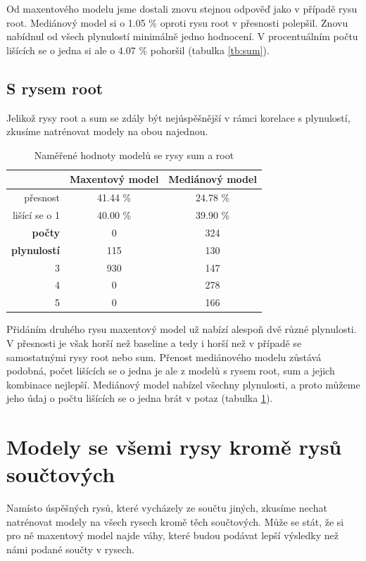 \documentclass[12pt,a4paper]{report}
\begin{document}
Od maxentového modelu jsme dostali znovu stejnou odpověď jako v případě rysu root. Mediánový model si o 1.05 \% oproti rysu root v přesnosti polepšil. Znovu nabídnul od všech plynulostí minimálně jedno hodnocení. V procentuálním počtu lišících se o jedna si ale o 4.07 \% pohoršil (tabulka \ref{tb:sum}).

\subsection{S rysem root}
Jelikož rysy root a sum se zdály být nejúspěšnější v rámci korelace s plynulostí, zkusíme natrénovat modely na obou najednou.

\begin{table}[!htbp]
\begin{center}
\begin{tabular}{|r|c|c|}
\hline
 & \textbf{Maxentový model} & \textbf{Mediánový model} \\
 \hline
     přesnost & 41.44 \%  & 24.78 \%  \\
\hline
lišící se o 1 & 40.00 \% & 39.90 \%  \\
\hline
     \textbf{počty} \quad 1 & \color{red}0   & \color{OliveGreen}324   \\
\textbf{plynulostí} \quad 2 & 115 & \color{OliveGreen}130   \\
                          3 & 930 & \color{OliveGreen}147 \\
                          4 & \color{red}0   & \color{OliveGreen}278 \\
                          5 & \color{red}0   & \color{OliveGreen}166  \\
\hline
\end{tabular}
\caption{Naměřené hodnoty modelů se rysy sum a root}\label{tb:sumroot}
\end{center}
\end{table}

Přidáním druhého rysu maxentový model už nabízí alespoň dvě různé plynulosti. V přesnosti je však horší než baseline a tedy i horší než v případě se samostatnými rysy root nebo sum. Přenost mediánového modelu zůstává podobná, počet lišících se o jedna je ale z modelů s rysem root, sum a jejich kombinace nejlepší. Mediánový model nabízel všechny plynulosti, a proto můžeme jeho údaj o počtu lišících se o jedna brát v potaz (tabulka \ref{tb:sumroot}).

\section{Modely se všemi rysy kromě rysů součtových}
Namísto úspěšných rysů, které vycházely ze součtu jiných, zkusíme nechat natrénovat modely na všech rysech kromě těch součtových. Může se stát, že si pro ně maxentový model najde váhy, které budou podávat lepší výsledky než námi podané součty v rysech.
\end{document}
